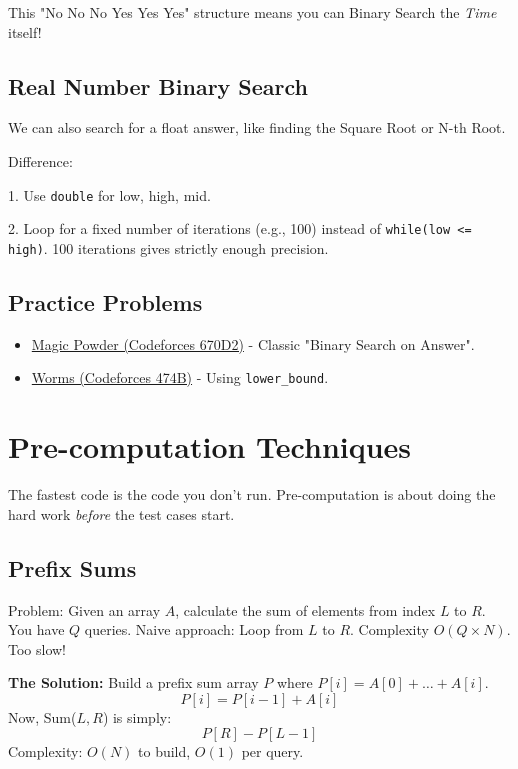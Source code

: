 \documentclass[12pt, a4paper]{report}
\begin{document}
This "No No No Yes Yes Yes" structure means you can Binary Search the \textit{Time} itself!



\section{Real Number Binary Search}

We can also search for a float answer, like finding the Square Root or N-th Root.

Difference:

1. Use \texttt{double} for low, high, mid.

2. Loop for a fixed number of iterations (e.g., 100) instead of \texttt{while(low <= high)}. 100 iterations gives strictly enough precision.



\section{Practice Problems}

\begin{itemize}

    \item \href{https://codeforces.com/problemset/problem/670/D2}{Magic Powder (Codeforces 670D2)} - Classic "Binary Search on Answer".

    \item \href{https://codeforces.com/problemset/problem/474/B}{Worms (Codeforces 474B)} - Using \texttt{lower\_bound}.

\end{itemize}

\chapter{Pre-computation Techniques}
The fastest code is the code you don't run. Pre-computation is about doing the hard work \textit{before} the test cases start.

\section{Prefix Sums}
Problem: Given an array $A$, calculate the sum of elements from index $L$ to $R$. You have $Q$ queries.
Naive approach: Loop from $L$ to $R$. Complexity $O(Q \times N)$. Too slow!

\textbf{The Solution:} Build a prefix sum array $P$ where $P[i] = A[0] + \dots + A[i]$.
\[ P[i] = P[i-1] + A[i] \]
Now, Sum($L, R$) is simply:
\[ P[R] - P[L-1] \]
Complexity: $O(N)$ to build, $O(1)$ per query.
\end{document}
